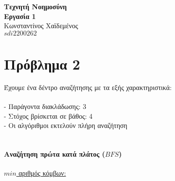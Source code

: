 \documentclass[12pt]{article}
\begin{document}
	\begin{center}
    	\huge \textbf{Τεχνητή Νοημοσύνη \\ Εργασία 1} \\
    	\Large Κωνσταντίνος Χαϊδεμένος\\
    	\large $sdi2200262$\\ 
	\end{center}
\vspace{36pt}
\section*{Πρόβλημα 2} 
Έχουμε ένα δέντρο αναζήτησης με τα εξής χαρακτηριστικά:\\\\
- Παράγοντα διακλάδωσης: 3\\
- Στόχος βρίσκεται σε βάθος: 4\\
- Οι αλγόριθμοι εκτελούν πλήρη αναζήτηση\\\\\\
\textbf{Αναζήτηση πρώτα κατά πλάτος ($BFS$)}\\\\
\underline{$min$ αριθμός κόμβων:}\\
\end{document}
